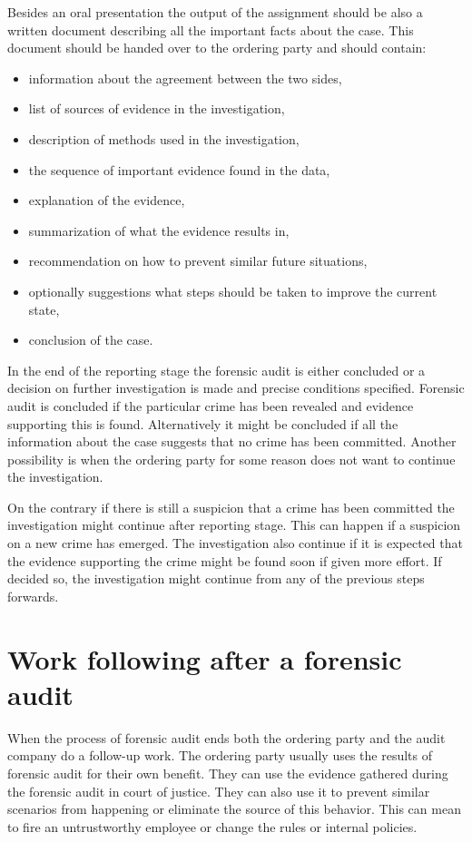Besides an oral presentation the output of the assignment should be also a written document describing all the important facts about the case. This document should be handed over to the ordering party and should contain:
\begin{itemize}
\item information about the agreement between the two sides,
\item list of sources of evidence in the investigation,
\item description of methods used in the investigation,
\item the sequence of important evidence found in the data,
\item explanation of the evidence,
\item summarization of what the evidence results in,
\item recommendation on how to prevent similar future situations,
\item optionally suggestions what steps should be taken to improve the current state,
\item conclusion of the case.
\end {itemize}


In the end of the reporting stage the forensic audit is either concluded or a decision on further investigation is made and precise conditions specified. Forensic audit is concluded if the particular crime has been revealed and evidence supporting this is found. Alternatively it might be concluded if all the information about the case suggests that no crime has been committed. Another possibility is when the ordering party for some reason does not want to continue the investigation. 

On the contrary if there is still a suspicion that a crime has been committed the investigation might continue after reporting stage. This can happen if a suspicion on a new crime has emerged. The investigation also continue if it is expected that the evidence supporting the crime might be found soon if given more effort. If decided so, the investigation might continue from any of the previous steps forwards. 

\section{Work following after a forensic audit}

When the process of forensic audit ends both the ordering party and the audit company do a follow-up work. The ordering party usually uses the results of forensic audit for their own benefit. They can use the evidence gathered during the forensic audit in court of justice. They can also use it to prevent similar scenarios from happening or eliminate the source of this behavior. This can mean to fire an untrustworthy employee or change the rules or internal policies. 

